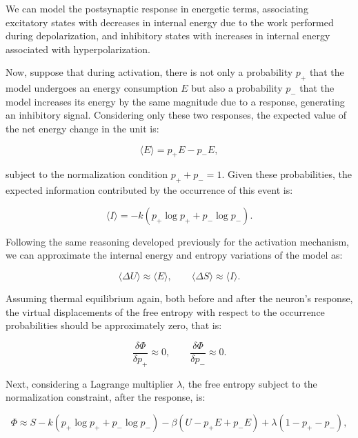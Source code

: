\documentclass[12pt]{article}
\begin{document}
We can model the postsynaptic response in energetic terms, associating excitatory states with decreases in internal energy due to the work performed during depolarization, and inhibitory states with increases in internal energy associated with hyperpolarization.

Now, suppose that during activation, there is not only a probability $p_+$ that the model undergoes an energy consumption $E$ but also a probability $p_-$ that the model increases its energy by the same magnitude due to a response, generating an inhibitory signal. Considering only these two responses, the expected value of the net energy change in the unit is:

\begin{equation}
\langle E \rangle = p_+ E - p_- E  ,
\end{equation}

subject to the normalization condition $p_+ + p_- = 1$. Given these probabilities, the expected information contributed by the occurrence of this event is:

\begin{equation}
\langle I \rangle = - k (p_+ \log p_+ + p_- \log p_-)  .
\end{equation}

Following the same reasoning developed previously for the activation mechanism, we can approximate the internal energy and entropy variations of the model as:

\begin{equation}
\langle \Delta U \rangle \approx \langle E \rangle  
,\qquad  
\langle \Delta S \rangle \approx \langle I \rangle.
\end{equation}

Assuming thermal equilibrium again, both before and after the neuron's response, the virtual displacements of the free entropy with respect to the occurrence probabilities should be approximately zero, that is:

\begin{equation}
\frac{\delta \Phi}{\delta p_+} \approx 0, \qquad \frac{\delta \Phi}{\delta p_-} \approx 0  .
\end{equation}

Next, considering a Lagrange multiplier $\lambda$, the free entropy subject to the normalization constraint, after the response, is:

\begin{equation}
\Phi \approx S - k (p_+ \log p_+ + p_- \log p_-) - \beta (U - p_+ E + p_- E) + \lambda (1 - p_+ - p_-),
\end{equation}
\end{document}
